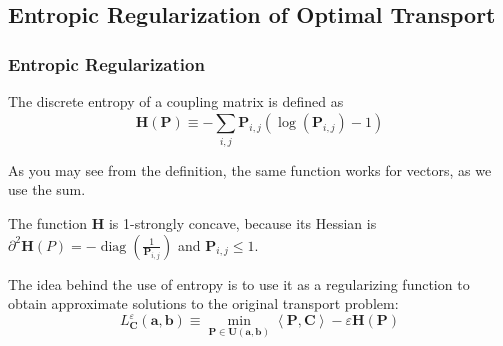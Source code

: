 \subsection{Entropic Regularization of Optimal Transport}

\subsubsection{Entropic Regularization}

\begin{definition}
  The discrete entropy of a coupling matrix is defined as
  \[ \mathbf{H}(\mathbf{P}) \equiv - \sum_{i, j}^{} \mathbf{P}_{i,j} \left( \log\left( \mathbf{P}_{i,j} \right) - 1 \right)  \] 
\end{definition}

As you may see from the definition, the same function works
for vectors, as we use the sum.

\begin{remark}
  The function $\mathbf{H}$ is 1-strongly concave, because its Hessian
  is $\partial^2 \mathbf{H} (P) = - \operatorname{diag}
  \left(\frac{1}{\mathbf{P}_{i,j}}\right)$ 
  and $\mathbf{P}_{i,j} \le 1$.
\end{remark}

The idea behind the use of entropy is to use it as a regularizing
function to obtain approximate solutions to the original transport problem:
\[ L_{\mathbf{C}}^{\varepsilon} (\mathbf{a}, \mathbf{b}) \equiv
\min_{\mathbf{P} \in  \mathbf{U} (\mathbf{a}, \mathbf{b})}
\left< \mathbf{P}, \mathbf{C} \right> - \varepsilon \mathbf{H} (\mathbf{P})
\] 
